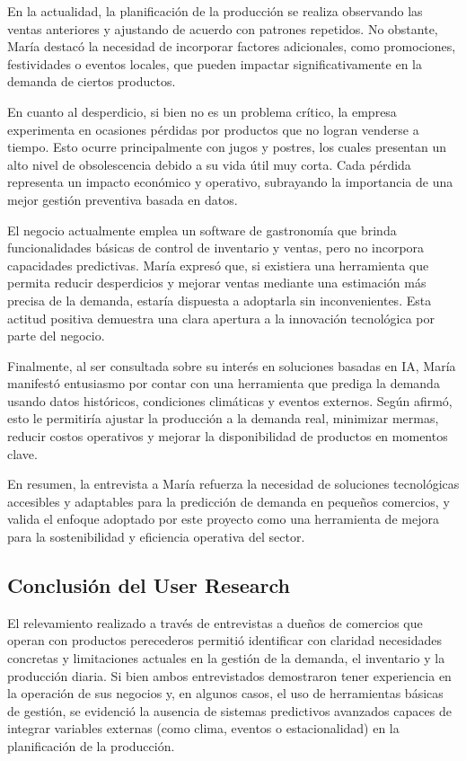 \indent En la actualidad, la planificación de la producción se realiza observando las ventas anteriores y ajustando de acuerdo con patrones repetidos. No obstante, María destacó la necesidad de incorporar factores adicionales, como promociones, festividades o eventos locales, que pueden impactar significativamente en la demanda de ciertos productos.

\indent En cuanto al desperdicio, si bien no es un problema crítico, la empresa experimenta en ocasiones pérdidas por productos que no logran venderse a tiempo. Esto ocurre principalmente con jugos y postres, los cuales presentan un alto nivel de obsolescencia debido a su vida útil muy corta. Cada pérdida representa un impacto económico y operativo, subrayando la importancia de una mejor gestión preventiva basada en datos.

\indent El negocio actualmente emplea un software de gastronomía que brinda funcionalidades básicas de control de inventario y ventas, pero no incorpora capacidades predictivas. María expresó que, si existiera una herramienta que permita reducir desperdicios y mejorar ventas mediante una estimación más precisa de la demanda, estaría dispuesta a adoptarla sin inconvenientes. Esta actitud positiva demuestra una clara apertura a la innovación tecnológica por parte del negocio.

\indent Finalmente, al ser consultada sobre su interés en soluciones basadas en IA, María manifestó entusiasmo por contar con una herramienta que prediga la demanda usando datos históricos, condiciones climáticas y eventos externos. Según afirmó, esto le permitiría ajustar la producción a la demanda real, minimizar mermas, reducir costos operativos y mejorar la disponibilidad de productos en momentos clave.

\indent En resumen, la entrevista a María refuerza la necesidad de soluciones tecnológicas accesibles y adaptables para la predicción de demanda en pequeños comercios, y valida el enfoque adoptado por este proyecto como una herramienta de mejora para la sostenibilidad y eficiencia operativa del sector.


\subsection{Conclusión del User Research}

\indent El relevamiento realizado a través de entrevistas a dueños de comercios que operan con productos perecederos permitió identificar con claridad necesidades concretas y limitaciones actuales en la gestión de la demanda, el inventario y la producción diaria. Si bien ambos entrevistados demostraron tener experiencia en la operación de sus negocios y, en algunos casos, el uso de herramientas básicas de gestión, se evidenció la ausencia de sistemas predictivos avanzados capaces de integrar variables externas (como clima, eventos o estacionalidad) en la planificación de la producción.

